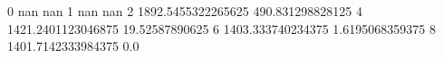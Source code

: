 0 nan nan
1 nan nan
2 1892.5455322265625 490.831298828125
4 1421.2401123046875 19.52587890625
6 1403.333740234375 1.6195068359375
8 1401.7142333984375 0.0
